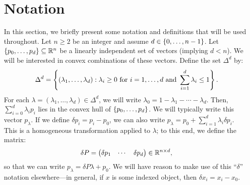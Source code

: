 \documentclass[eikonal.tex]{subfiles}
\begin{document}
\section{Notation}

In this section, we briefly present some notation and definitions that
will be used throughout. Let $n \geq 2$ be an integer and assume
$d \in \left\{0, \hdots, n - 1\right\}$. Let
$\left\{p_0, \hdots, p_d\right\} \subseteq \mathbb{R}^n$ be a linearly independent set
of vectors (implying $d < n$). We will be interested in convex
combinations of these vectors. Define the set $\Delta^d$ by:
\begin{align*}
  \Delta^d = \left\{(\lambda_1, \hdots, \lambda_d) : \lambda_i \geq 0 \mbox{ for } i = 1, \hdots, d \mbox{ and } \sum_{i=1}^d \lambda_i \leq 1\right\}.
\end{align*}
For each $\lambda = (\lambda_1, \hdots, \lambda_d) \in \Delta^d$, we
will write $\lambda_0 = 1 - \lambda_1 - \cdots - \lambda_d$. Then,
$\sum_{i=0}^d \lambda_i p_i$ lies in the convex hull of
$\left\{p_0, \hdots, p_d\right\}$. We will typically write this vector
$p_\lambda$. If we define $\delta p_i = p_i - p_0$, we can also write
$p_\lambda = p_0 + \sum_{i=1}^d \lambda_i \delta p_i$. This is a
homogeneous transformation applied to $\lambda$; to this end, we
define the matrix:
\begin{align*}
  \delta P = \begin{pmatrix} \delta p_1 & \cdots & \delta p_d \end{pmatrix} \in \mathbb{R}^{n \times d},
\end{align*}
so that we can write $p_\lambda = \delta P \lambda + p_0$. We will
have reason to make use of this ``$\delta$'' notation elsewhere---in
general, if $x$ is some indexed object, then $\delta x_i = x_i - x_0$.
\end{document}
